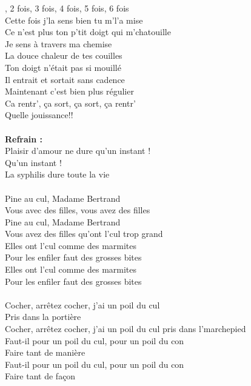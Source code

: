 
, 2 fois, 3 fois, 4 fois, 5 fois, 6 fois
\\Cette fois j'la sens bien tu m'l'a mise
\\Ce n'est plus ton p'tit doigt qui m'chatouille
\\Je sens à travers ma chemise
\\La douce chaleur de tes couilles
\\Ton doigt n'était pas si mouillé
\\Il entrait et sortait sans cadence
\\Maintenant c'est bien plus régulier
\\Ca rentr', ça sort, ça sort, ça rentr'
\\Quelle jouissance!!
\\\\\textbf{Refrain :}
\\Plaisir d'amour ne dure qu'un instant !
\\Qu'un instant !
\\La syphilis dure toute la vie
\\\\Pine au cul, Madame Bertrand
\\Vous avec des filles, vous avez des filles
\\Pine au cul, Madame Bertrand
\\Vous avez des filles qu'ont l'cul trop grand
\\Elles ont l'cul comme des marmites
\\Pour les enfiler faut des grosses bites
\\Elles ont l'cul comme des marmites
\\Pour les enfiler faut des grosses bites
\\\\Cocher, arrêtez cocher, j'ai un poil du cul
\\Pris dans la portière
\\Cocher, arrêtez cocher, j'ai un poil du cul pris dans l'marchepied
\\Faut-il pour un poil du cul, pour un poil du con
\\Faire tant de manière
\\Faut-il pour un poil du cul, pour un poil du con
\\Faire tant de façon
